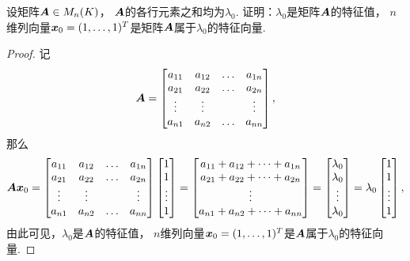 \begin{example}\label{example:特征值与特征向量.各行元素之和相同的矩阵的特征值与特征向量}
设矩阵\(\boldsymbol{A} \in M_n(K)\)，
\(\boldsymbol{A}\)的各行元素之和均为\(\lambda_0\).
证明：\(\lambda_0\)是矩阵\(\boldsymbol{A}\)的特征值，
\(n\)维列向量\(\boldsymbol{x}_0=(1,\dotsc,1)^T\)是矩阵\(\boldsymbol{A}\)属于\(\lambda_0\)的特征向量.
\begin{proof}
记\[
	\boldsymbol{A}
	= \begin{bmatrix}
		a_{11} & a_{12} & \dots & a_{1n} \\
		a_{21} & a_{22} & \dots & a_{2n} \\
		\vdots & \vdots & & \vdots \\
		a_{n1} & a_{n2} & \dots & a_{nn}
	\end{bmatrix},
\]
那么\[
	\boldsymbol{A} \boldsymbol{x}_0
	= \begin{bmatrix}
		a_{11} & a_{12} & \dots & a_{1n} \\
		a_{21} & a_{22} & \dots & a_{2n} \\
		\vdots & \vdots & & \vdots \\
		a_{n1} & a_{n2} & \dots & a_{nn}
	\end{bmatrix}
	\begin{bmatrix}
		1 \\ 1 \\ \vdots \\ 1
	\end{bmatrix}
	= \begin{bmatrix}
		a_{11} + a_{12} + \dotsb + a_{1n} \\
		a_{21} + a_{22} + \dotsb + a_{2n} \\
		\vdots \\
		a_{n1} + a_{n2} + \dotsb + a_{nn}
	\end{bmatrix}
	= \begin{bmatrix}
		\lambda_0 \\ \lambda_0 \\ \vdots \\ \lambda_0
	\end{bmatrix}
	= \lambda_0
	\begin{bmatrix}
		1 \\ 1 \\ \vdots \\ 1
	\end{bmatrix},
\]
由此可见，\(\lambda_0\)是\(\boldsymbol{A}\)的特征值，
\(n\)维列向量\(\boldsymbol{x}_0=(1,\dotsc,1)^T\)是\(\boldsymbol{A}\)属于\(\lambda_0\)的特征向量.
\end{proof}
\end{example}

